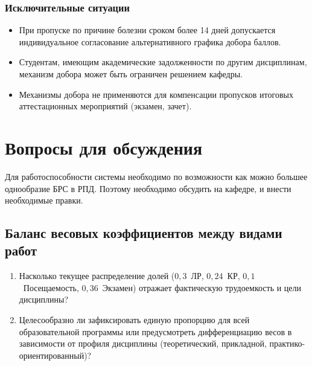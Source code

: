 \documentclass[10pt,a4paper]{article}
\begin{document}
    \subsubsection{Исключительные ситуации}
    \begin{itemize}
        \item При пропуске по причине болезни сроком более 14 дней допускается индивидуальное согласование альтернативного графика добора баллов.

        \item Студентам, имеющим академические задолженности по другим дисциплинам, механизм добора может быть ограничен решением кафедры.

        \item Механизмы добора не применяются для компенсации пропусков итоговых аттестационных мероприятий (экзамен, зачет).
    \end{itemize}


    \section{Вопросы для обсуждения}

    Для работоспособности системы необходимо по возможности как можно большее однообразие БРС в РПД. Поэтому необходимо обсудить на кафедре, и внести необходимые правки.

    \subsection{Баланс весовых коэффициентов между видами работ}

    \begin{enumerate}
        \item Насколько текущее распределение долей ($0,3$~ЛР, $0,24$~КР, $0,1$~Посещаемость, $0,36$~Экзамен) отражает фактическую трудоемкость и цели дисциплины?

        \item Целесообразно ли зафиксировать единую пропорцию для всей образовательной программы или предусмотреть дифференциацию весов в зависимости от профиля дисциплины (теоретический, прикладной, практико-ориентированный)?
    \end{enumerate}
\end{document}

